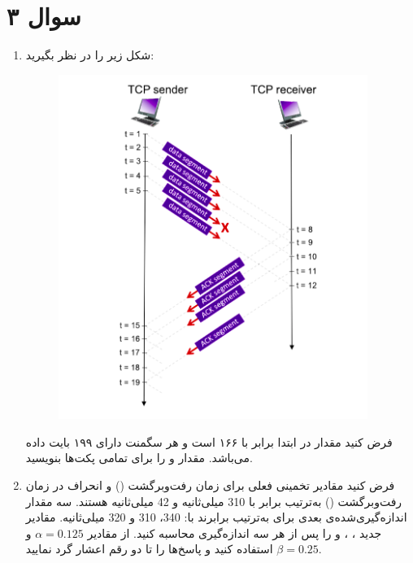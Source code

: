 \section*{سوال ۳}

\begin{enumerate}[label=\alph*)]

\item 
شکل زیر را در نظر بگیرید:  

\begin{figure}[H]
    \centering
    \includegraphics[width=0.95\textwidth]{Questions/pics/Q3.png}
    \caption{}
    \label{fig:small-example}
\end{figure}

فرض کنید مقدار  در ابتدا برابر با ۱۶۶ است و هر سگمنت دارای ۱۹۹ بایت داده می‌باشد.  
مقدار  و  را برای تمامی پکت‌ها بنویسید.

\item 
فرض کنید مقادیر تخمینی فعلی  برای زمان رفت‌وبرگشت () و انحراف در زمان رفت‌وبرگشت () به‌ترتیب برابر با 310 میلی‌ثانیه و 42 میلی‌ثانیه هستند.  
سه مقدار اندازه‌گیری‌شده‌ی بعدی برای  به‌ترتیب برابرند با: 340، 310 و 320 میلی‌ثانیه.  
مقادیر جدید ، ، و  را پس از هر سه اندازه‌گیری محاسبه کنید.  
از مقادیر \(\alpha = 0.125\) و \(\beta = 0.25\) استفاده کنید و پاسخ‌ها را تا دو رقم اعشار گرد نمایید.

\end{enumerate}
